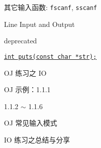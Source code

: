 \begin{frame}{其它输入函数: \texttt{fscanf}, \texttt{sscanf}}
  \begin{center}
    \href{}{} 

    \href{}{}
  \end{center}
\end{frame}

\begin{frame}{Line Input and Output}
  \begin{center}
    \href{}{\text{}}

    \href{}{} deprecated

    \href{http://www.cplusplus.com/reference/cstdio/puts/}
    {\texttt{int puts(const char *str);}}
  \end{center}
\end{frame}

\begin{frame}{OJ 练习之 IO}
  \centerline{OJ 示例：1.1.1}

  \vspace{0.80cm}
  \pause
  \centerline{1.1.2 $\sim$ 1.1.6}
\end{frame}

\begin{frame}{OJ 常见输入模式}
  \centerline{IO 练习之总结与分享}
\end{frame}
